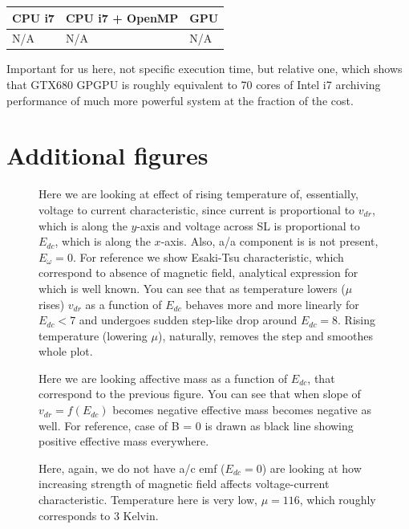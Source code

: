 \documentclass[40pt,letterpaper,physrev]{article}
\begin{document}
    \begin{center}
    \begin{tabular}{| l | l | l |}
    \hline
    CPU i7 & CPU i7 + OpenMP & GPU \\ \hline
    N/A & N/A & N/A \\ \hline
    \end{tabular}
    \end{center}
    
    Important for us here, not specific execution time, but relative one, which shows that GTX680 GPGPU is roughly equivalent 
    to 70 cores of Intel i7 archiving performance of much more powerful system at the fraction of the cost.
    \newpage        
    \section{Additional figures}
	\begin{figure}[H]
	  \centering
	  \normalsize
	  
	  \label{fig:v_dr_of_E_dc_B=4_different_mu}
	  \caption{Here we are looking at effect of rising temperature of, essentially, voltage to current characteristic,
	  since current is proportional to $v_{dr}$, which is along the $y$-axis and voltage across SL is proportional to 
	  $E_{dc}$, which is along the $x$-axis. Also, a/a component is is not present, $E_{\omega} = 0$. For reference we
	  show Esaki-Tsu characteristic, which correspond to absence of magnetic field, analytical expression for which
	  is well known. You can see that as temperature lowers ($\mu$ rises) $v_{dr}$ as a function of $E_{dc}$ behaves
	  more and more linearly for $E_{dc} < 7$ and undergoes sudden step-like drop around $E_{dc} = 8$. Rising temperature
	  (lowering $\mu$), naturally, removes the step and smoothes whole plot.}
	\end{figure}
	\newpage
	\begin{figure}[H]
	  \centering
	  \normalsize
	  
	  \label{fig:effect1ive_mass_of_E_dc_B=4_different_mu}
	  \caption{Here we are looking affective mass as a function of $E_{dc}$, that correspond to the previous figure. 
	  You can see that when slope of $v_{dr} = f(E_{dc})$ becomes negative effective mass becomes negative as well. 
	  For reference, case of B = 0 is drawn as black line showing positive effective mass everywhere.}
	\end{figure}
	\newpage
	\begin{figure}[H]
	  \centering
	  \normalsize %
	  
	  \label{fig:v_dr_of_E_dc_different_B}
	  \caption{Here, again, we do not have a/c emf ($E_{dc} = 0$) are looking at how increasing strength of magnetic field
affects voltage-current characteristic. Temperature here is very low, $\mu = 116$, which roughly corresponds 
to 3 Kelvin.}
	\end{figure}
\end{document}
